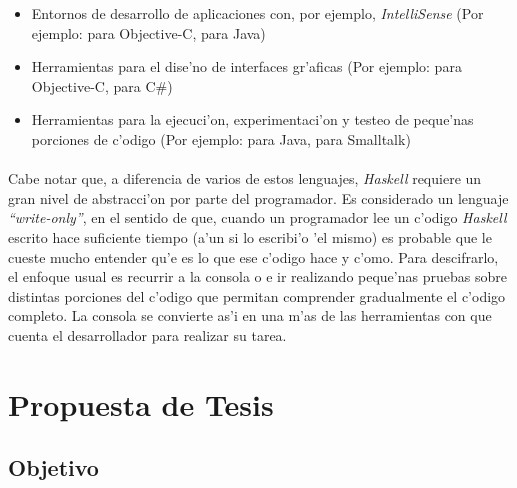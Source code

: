 \documentclass[a4paper]{article}
\begin{document}
\begin{itemize}
\item Entornos de desarrollo de aplicaciones con, por ejemplo, \textsl{IntelliSense} (Por ejemplo:  para Objective-C,  para Java)
\item Herramientas para el dise'no de interfaces gr'aficas (Por ejemplo:  para Objective-C,  para C\#)
\item Herramientas para la ejecuci'on, experimentaci'on y testeo de peque'nas porciones de c'odigo (Por ejemplo:  para Java,  para Smalltalk)
\end{itemize}
\paragraph{}Cabe notar que, a diferencia de varios de estos lenguajes, \textit{Haskell} requiere un gran nivel de abstracci'on por parte del programador.  Es considerado un lenguaje \textsl{``write-only''}, en el sentido de que, cuando un programador lee un c'odigo \textit{Haskell} escrito hace suficiente tiempo (a'un si lo escribi'o 'el mismo) es probable que le cueste mucho entender qu'e es lo que ese c'odigo hace y c'omo.  Para descifrarlo, el enfoque usual es recurrir a la consola  o  e ir realizando peque'nas pruebas sobre distintas porciones del c'odigo que permitan comprender gradualmente el c'odigo completo.  La consola se convierte as'i en una m'as de las herramientas con que cuenta el desarrollador para realizar su tarea.

\section{Propuesta de Tesis}
\subsection{Objetivo}
\end{document}
